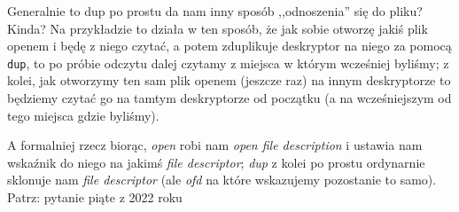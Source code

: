 Generalnie to dup po prostu da nam inny sposób ,,odnoszenia'' się do pliku? Kinda? Na przykładzie to działa w ten sposób, że jak sobie otworzę jakiś plik openem i będę z niego czytać, a potem zduplikuje deskryptor na niego za pomocą \texttt{dup}, to po próbie odczytu dalej czytamy z miejsca w którym wcześniej byliśmy; z kolei, jak otworzymy ten sam plik openem (jeszcze raz) na innym deskryptorze to będziemy czytać go na tamtym deskryptorze od początku (a na wcześniejszym od tego miejsca gdzie byliśmy).

A formalniej rzecz biorąc, \textit{open} robi nam \textit{open file description} i ustawia nam wskaźnik do niego na jakimś \textit{file descriptor}; \textit{dup} z kolei po prostu ordynarnie sklonuje nam \textit{file descriptor} (ale \textit{ofd} na które wskazujemy pozostanie to samo). Patrz: pytanie piąte z 2022 roku
